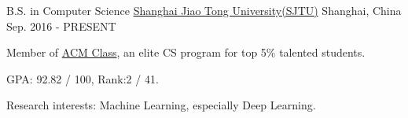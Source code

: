 \begin{cventries}
	\cventry
	{B.S. in Computer Science}
	{\href{http://en.sjtu.edu.cn/}{Shanghai Jiao Tong University(SJTU)}}
	{Shanghai, China}
	{Sep. 2016 - PRESENT}
	{
		\begin{cvitems}
			\item {Member of \href{https://acm.sjtu.edu.cn}{ACM Class}, an elite CS program for top 5\% talented students.}
            \item {GPA: 92.82 / 100, Rank:2 / 41.}
            \item {Research interests: Machine Learning, especially Deep Learning.}
		\end{cvitems}
	}
\end{cventries}
